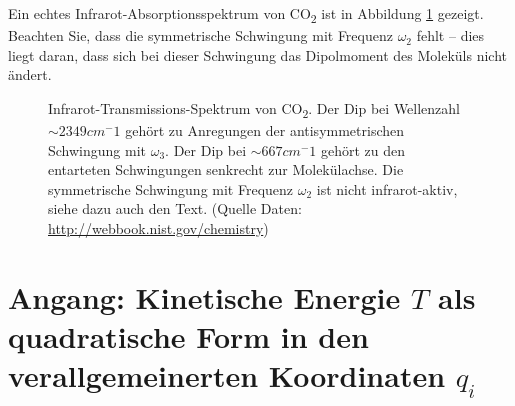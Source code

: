 \documentclass[paper=a4, fontsize=11.0pt, abstractoff, DIV12]{scrartcl}
\begin{document}
Ein echtes Infrarot-Absorptionsspektrum von CO\textsubscript{2} ist in
Abbildung \ref{fig:Spektrum} gezeigt. Beachten Sie, dass die symmetrische
Schwingung mit Frequenz $\omega_2$ fehlt -- dies liegt daran, dass sich bei
dieser Schwingung das Dipolmoment des Moleküls nicht ändert.

\begin{figure}
    \centering
    
    \caption{Infrarot-Transmissions-Spektrum von CO\textsubscript{2}. Der
    Dip bei Wellenzahl $\sim \unit{2349}{cm^-1}$ gehört zu Anregungen der
    antisymmetrischen Schwingung mit $\omega_3$. Der Dip bei $\sim
    \unit{667}{cm^-1}$ gehört zu den entarteten Schwingungen senkrecht zur
    Molekülachse. Die symmetrische Schwingung mit Frequenz $\omega_2$ ist
    nicht infrarot-aktiv, siehe dazu auch den Text.
    (Quelle Daten: \url{http://webbook.nist.gov/chemistry})}
    \label{fig:Spektrum}
\end{figure}





\section*{Angang: Kinetische Energie $T$ als quadratische Form in den verallgemeinerten Koordinaten $q_i$}
\end{document}
